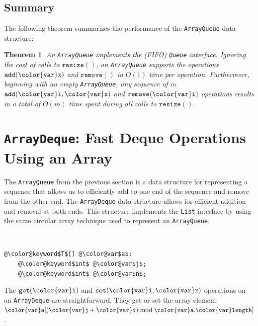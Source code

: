 \documentclass[10pt]{book}
\newcommand{\seclabel}[1]{\label{sec:#1}}
\theoremstyle{plain}
\newtheorem{thm}{Theorem}[chapter]
\theoremstyle{definition}
\begin{document}
\subsection{Summary}

The following theorem summarizes the performance of the \texttt{ArrayQueue}
data structure:

\begin{thm}
An \texttt{ArrayQueue} implements the (FIFO) \texttt{Queue} interface.  Ignoring the cost of
calls to \ensuremath{\mathtt{resize()}}, an \texttt{ArrayQueue} supports the operations
\ensuremath{\mathtt{add({\color{var}x})}} and \ensuremath{\mathtt{remove()}} in $O(1)$ time per operation.
Furthermore, beginning with an empty \texttt{ArrayQueue}, any sequence of $m$
\ensuremath{\mathtt{add({\color{var}i},{\color{var}x})}} and \ensuremath{\mathtt{remove({\color{var}i})}} operations results in a total of $O(m)$
time spent during all calls to \ensuremath{\mathtt{resize()}}.
\end{thm}


\section{\texttt{ArrayDeque}: Fast Deque Operations Using an Array}
\seclabel{arraydeque}

%
The \texttt{ArrayQueue} from the previous section is a data structure for
representing a sequence that allows us to efficiently add to one
end of the sequence and remove from the other end.  The \texttt{ArrayDeque}
data structure allows for efficient addition and removal at both ends.
This structure implements the \texttt{List} interface by using the same circular
array technique used to represent an \texttt{ArrayQueue}.



 \ \vspace{.5ex}\begin{Verbatim}[gobble=1,tabsize=2,frame=single,framerule=1.2pt,commandchars=\\@\$,label=\texttt{ArrayDeque},labelposition=topline]
	@\color@keyword$T$[] @\color@var$a$;
	@\color@keyword$int$ @\color@var$j$;
	@\color@keyword$int$ @\color@var$n$;
\end{Verbatim}


The \ensuremath{\mathtt{get({\color{var}i})}} and \ensuremath{\mathtt{set({\color{var}i},{\color{var}x})}} operations on an \texttt{ArrayDeque} are
straightforward.  They get or set the array element $\ensuremath{\mathtt{{\color{var}a}[}}{\ensuremath{\mathtt{({\color{var}j}+{\color{var}i})}}\bmod
\ensuremath{\mathtt{{\color{var}a}.{\color{var}length}}}}\ensuremath{\mathtt{]}}$.
\end{document}

